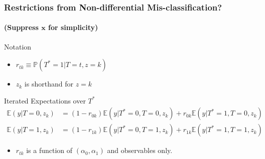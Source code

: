 \documentclass{beamer}
\begin{document}
\begin{frame}[t]
  \frametitle{Restrictions from Non-differential Mis-classification?}
  \framesubtitle{(Suppress $\mathbf{x}$ for simplicity)}

  \footnotesize

  \begin{block}{Notation}
    \begin{itemize}
      \item $r_{tk} \equiv \mathbb{P}(T^*=1|T=t,z=k)$ 
      \item $z_k$ is shorthand for $z =k$\\
    \end{itemize}
  \end{block}

  \begin{block}{Iterated Expectations over $T^*$}
    \vspace{-1em}
  \begin{align*}
    \mathbb{E}(y|T=0,z_k) &= (1 - r_{0k})\mathbb{E}(y|T^*=0,T=0,z_k) + r_{0k}\mathbb{E}(y|T^*=1,T=0,z_k)\\
    \mathbb{E}(y|T=1,z_k) &= (1 - r_{1k}) \mathbb{E}(y|T^*=0,T=1,z_k) + r_{1k}\mathbb{E}(y|T^*=1,T=1,z_k)
  \end{align*}
  \end{block}


  \begin{itemize}
    \item $r_{tk}$ is a function of $(\alpha_0, \alpha_1)$ and observables only.
  \end{itemize}

\end{frame}
\end{document}
